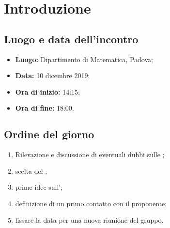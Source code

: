 \section*{Introduzione}

\subsection*{Luogo e data dell'incontro}
	\begin{itemize}
		\item \textbf{Luogo:} Dipartimento di Matematica, Padova;

		\item \textbf{Data:} 10 dicembre 2019;

		\item \textbf{Ora di inizio:} 14:15;
		\item \textbf{Ora di fine:} 18:00.
	\end{itemize}

\subsection*{Ordine del giorno}
	\begin{enumerate}

		\item Rilevazione e discussione di eventuali dubbi sulle ;
		\item scelta del ;
		\item prime idee sull';
		\item definizione di un primo contatto con il proponente;
		\item fissare la data per una nuova riunione del gruppo.

	\end{enumerate}

